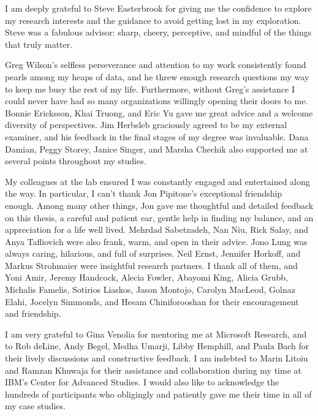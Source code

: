 \documentclass{ut-thesis}
\begin{document}
\begin{preliminary}

\begin{acknowledgements}

I am deeply grateful to Steve Easterbrook for giving me the confidence to explore my research interests and the guidance to avoid getting lost in my exploration. Steve was a fabulous advisor: sharp, cheery, perceptive, and mindful of the things that truly matter.

Greg Wilson's selfless perseverance and attention to my work consistently found pearls among my heaps of data, and he threw enough research questions my way to keep me busy the rest of my life. Furthermore, without Greg's assistance I could never have had so many organizations willingly opening their doors to me. Bonnie Ericksson, Khai Truong, and Eric Yu gave me great advice and a welcome diversity of perspectives. Jim Herbsleb graciously agreed to be my external examiner, and his feedback in the final stages of my degree was invaluable. Dana Damian, Peggy Storey, Janice Singer, and Marsha Chechik also supported me at several points throughout my studies.

My colleagues at the lab ensured I was constantly engaged and entertained along the way. In particular, I can't thank Jon Pipitone's exceptional friendship enough. Among many other things, Jon gave me thoughtful and detailed feedback on this thesis, a careful and patient ear, gentle help in finding my balance, and an appreciation for a life well lived. Mehrdad Sabetzadeh, Nan Niu, Rick Salay, and Anya Tafliovich were also frank, warm, and open in their advice. Jono Lung was always caring, hilarious, and full of surprises. Neil Ernst, Jennifer Horkoff, and Markus Strohmaier were insightful research partners. I thank all of them, and Yoni Amir, Jeremy Handcock, Alecia Fowler, Abayomi King, Alicia Grubb, Michalis Famelis, Sotirios Liaskos, Jason Montojo, Carolyn MacLeod, Golnaz Elahi, Jocelyn Simmonds, and Hesam Chiniforooshan for their encouragement and friendship.

I am very grateful to Gina Venolia for mentoring me at Microsoft Research, and to Rob deLine, Andy Begel, Medha Umarji, Libby Hemphill, and Paula Bach for their lively discussions and constructive feedback. I am indebted to Marin Litoiu and Ramzan Khuwaja for their assistance and collaboration during my time at IBM's Center for Advanced Studies. I would also like to acknowledge the hundreds of participants who obligingly and patiently gave me their time in all of my case studies.


\end{acknowledgements}
\end{preliminary}
\end{document}
